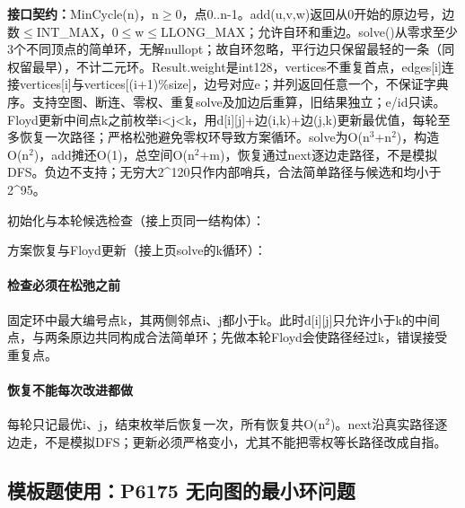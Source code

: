 {\sloppy{}\noindent\textbf{接口契约：}MinCycle(n)，n$\ge$0，点0..n-1。add(u,v,w)返回从0开始的原边号，边数$\le$INT\_MAX，0$\le$w$\le$LLONG\_MAX；允许自环和重边。solve()从零求至少3个不同顶点的简单环，无解nullopt；故自环忽略，平行边只保留最轻的一条（同权留最早），不计二元环。Result.weight是int128，vertices不重复首点，edges[i]连接vertices[i]与vertices[(i+1)\%size]，边号对应e；并列返回任意一个，不保证字典序。支持空图、断连、零权、重复solve及加边后重算，旧结果独立；e/id只读。Floyd更新中间点k之前枚举i<j<k，用d[i][j]+边(i,k)+边(j,k)更新最优值，每轮至多恢复一次路径；严格松弛避免零权环导致方案循环。solve为O(n$^{3}$+n$^{2}$)，构造O(n$^{2}$)，add摊还O(1)，总空间O(n$^{2}$+m)，恢复通过next逐边走路径，不是模拟DFS。负边不支持；无穷大2\textasciicircum{}120只作内部哨兵，合法简单路径与候选和均小于2\textasciicircum{}95。\par}

\Needspace{466pt}



\newpage

\noindent 初始化与本轮候选检查（接上页同一结构体）：



\newpage

\noindent 方案恢复与Floyd更新（接上页solve的k循环）：



\paragraph{检查必须在松弛之前} 固定环中最大编号点k，其两侧邻点i、j都小于k。此时d[i][j]只允许小于k的中间点，与两条原边共同构成合法简单环；先做本轮Floyd会使路径经过k，错误接受重复点。

\paragraph{恢复不能每次改进都做} 每轮只记最优i、j，结束枚举后恢复一次，所有恢复共O(n$^{2}$)。next沿真实路径逐边走，不是模拟DFS；更新必须严格变小，尤其不能把零权等长路径改成自指。

\Needspace{388pt}

\subsection*{模板题使用：P6175 无向图的最小环问题}


